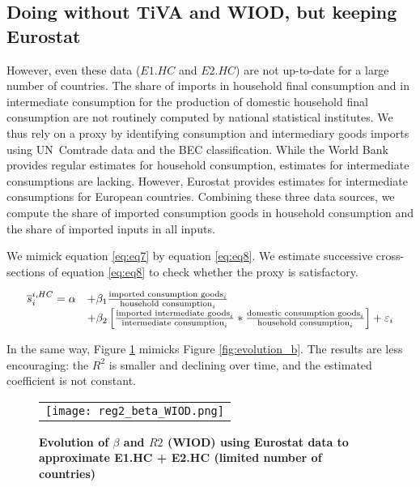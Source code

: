 \documentclass[12pt,a4paper]{paper}
\begin{document}
\subsection{Doing without TiVA and WIOD, but keeping Eurostat}
However, even these data ($E1.HC$ and $E2.HC$) are not up-to-date for a large number of countries. 
The share of imports in household final consumption and in intermediate consumption for the production of domestic household final consumption are not routinely computed by national statistical institutes. 
We thus rely on a proxy by identifying consumption and intermediary goods imports using UN Comtrade data and the BEC classification. 
While the World Bank provides regular estimates for household consumption, estimates for intermediate consumptions are lacking. 
However, Eurostat provides estimates for intermediate consumptions for European countries.
Combining these three data sources, we compute the share of imported consumption goods in household consumption and the share of imported inputs in all inputs. 

We mimick equation \ref{eq:eq7} by equation \ref{eq:eq8}. 
We estimate successive cross-sections of equation \ref{eq:eq8} to check whether the proxy is satisfactory. 

 \begin{equation}
 \begin{array}{llll}
\overline{s}_{i}^{i,HC}= \alpha &+  \beta_1  \frac{\textnormal{imported consumption goods}_i}{\textnormal{household consumption}_i} \\ & +  \beta_2  \left[    \frac{\textnormal{imported intermediate goods}_i}{\textnormal{intermediate consumption}_i}*\frac{\textnormal{domestic consumption goods}_i}{\textnormal{household consumption}_i}\right] +\varepsilon_i 
\end{array} 
\label{eq:eq8}
\end{equation}


In the same way, Figure \ref{fig:evolution_b_reg2} mimicks Figure \ref{fig:evolution_b}. 
The results are less encouraging: the $R^2$ is smaller and declining over time, and the estimated coefficient is not constant.


\begin{figure}[H]
	\centering
	\caption{\footnotesize{\textbf{Evolution of $\beta$ and $R2$ (WIOD) using Eurostat data to approximate E1.HC + E2.HC (limited number of countries)}}}
	\begin{tabular}{c}
		\texttt{[image: reg2\_beta\_WIOD.png]}\\
	\end{tabular}
	\label{fig:evolution_b_reg2}
\end{figure}
\end{document}
